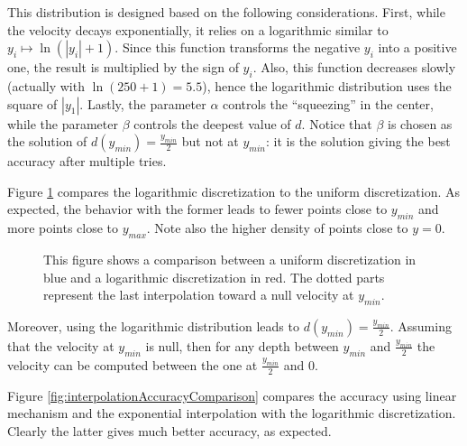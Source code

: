 \documentclass[final]{jcgt}
\begin{document}
This distribution is designed based on the following considerations.
First, while the velocity decays exponentially, it relies on a logarithmic similar to $y_i\mapsto \ln(|y_i|+1)$.
Since this function transforms the negative $y_i$ into a positive one, the result is multiplied by the sign of $y_i$.
Also, this function decreases slowly (actually with $\ln(250+1)=5.5$), hence the logarithmic distribution uses the square of $|y_1|$.
Lastly, the parameter $\alpha$ controls the “squeezing” in the center, while the parameter $\beta$ controls the deepest value of $d$.
Notice that $\beta$ is chosen as the solution of $d(y_{min})=\frac{y_{min}}{2}$ but not at $y_{min}$: it is the solution giving the best accuracy after multiple tries.

Figure \ref{fig:comparisonGrid} compares the logarithmic discretization to the uniform discretization. As expected, the behavior with the former leads to fewer points close to $y_{min}$ and more points close to $y_{max}$.
Note also the higher density of points close to $y=0$.

\begin{figure}[ht]
	\centering
	\hfill
	\caption{This figure shows a comparison between a \textcolor{bleuF}{uniform discretization in blue} and a \textcolor{redF}{logarithmic discretization in red}. The dotted parts represent the last interpolation toward a null velocity at $y_{min}$.}
	\label{fig:comparisonGrid}
\end{figure}

Moreover, using the logarithmic distribution leads to $d(y_{min})=\frac{y_{min}}{2}$.
Assuming that the velocity at $y_{min}$ is null, then for any depth between $y_{min}$ and $\frac{y_{min}}{2}$ the velocity can be computed between the one at $\frac{y_{min}}{2}$ and $0$.

Figure \ref{fig:interpolationAccuracyComparison} compares the accuracy using linear mechanism and the exponential interpolation with the logarithmic discretization.
Clearly the latter gives much better accuracy, as expected.
\end{document}
